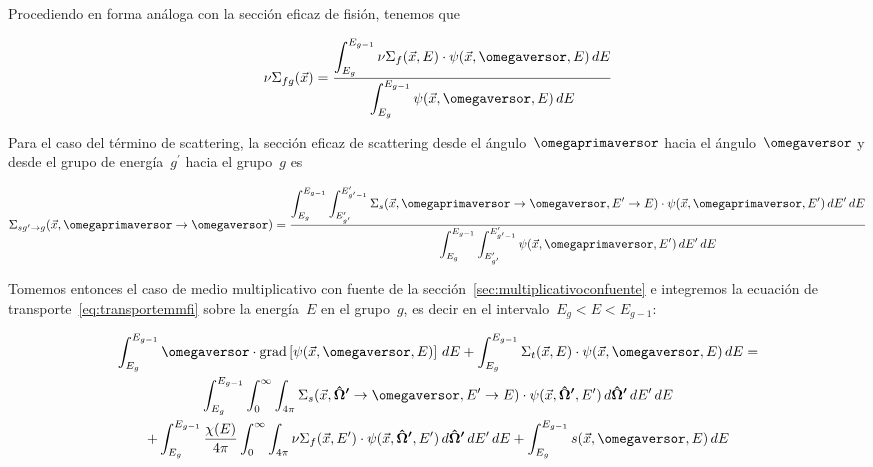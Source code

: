 Procediendo en forma análoga con la sección eficaz de fisión, tenemos que

\begin{equation}\label{eq:nusigmafg}
\nu\Sigma_{f g}(\vec{x}) = \frac{\displaystyle \int_{E_g}^{E_{g-1}} \nu\Sigma_f(\vec{x}, E) \cdot \psi(\vec{x}, \omegaversor, E) \, dE}{\displaystyle \int_{E_g}^{E_{g-1}} \psi(\vec{x}, \omegaversor, E) \, dE}
\end{equation}

Para el caso del término de scattering, la sección eficaz de scattering desde el ángulo~$\omegaprimaversor$ hacia el ángulo~$\omegaversor$ y desde el grupo de energía~$g^\prime$ hacia el grupo~$g$ es

\begin{equation}\label{eq:sigmasggprima}
\Sigma_{s g^\prime \rightarrow g}(\vec{x}, \omegaprimaversor \rightarrow \omegaversor) =
\frac{\displaystyle \int_{E_g}^{E_{g-1}} \int_{E^\prime_{g^\prime}}^{E^\prime_{g^\prime -1}}
\Sigma_{s}(\vec{x}, \omegaprimaversor \rightarrow \omegaversor, E^\prime \rightarrow E) \cdot \psi(\vec{x}, \omegaprimaversor, E^\prime) \, dE^\prime \, dE }
{\displaystyle \int_{E_g}^{E_{g-1}} \int_{E^\prime_{g^\prime}}^{E^\prime_{g^\prime -1}} \psi(\vec{x}, \omegaprimaversor, E^\prime) \, dE^\prime \, dE}
\end{equation}


\bigskip

Tomemos entonces el caso de medio multiplicativo con fuente de la sección~\ref{sec:multiplicativoconfuente} e integremos la ecuación de transporte~\eqref{eq:transportemmfi} sobre la energía~$E$ en el grupo~$g$, es decir en el intervalo~$E_g < E < E_{g-1}$:

\begin{multline*}
 \int_{E_g}^{E_{g-1}} \omegaversor \cdot \text{grad} \left[ \psi(\vec{x}, \omegaversor, E) \right] \, dE
 + \int_{E_g}^{E_{g-1}}  \Sigma_t(\vec{x}, E) \cdot \psi(\vec{x}, \omegaversor, E) \, dE = \\
 \int_{E_g}^{E_{g-1}}  \int_{0}^{\infty} \int_{4\pi} \Sigma_s(\vec{x}, \boldsymbol{\hat{\Omega}^\prime} \rightarrow \omegaversor, E^\prime \rightarrow E) \cdot \psi(\vec{x}, \boldsymbol{\hat{\Omega}^\prime}, E^\prime) \, d\boldsymbol{\hat{\Omega}^\prime} \, dE^\prime \, dE \\
+ \int_{E_g}^{E_{g-1}}  \frac{\chi(E)}{4\pi} \int_{0}^{\infty} \int_{4\pi} \nu\Sigma_f(\vec{x}, E^\prime) \cdot \psi(\vec{x}, \boldsymbol{\hat{\Omega}^\prime}, E^\prime) \, d\boldsymbol{\hat{\Omega}^\prime} \, dE^\prime \, dE
+ \int_{E_g}^{E_{g-1}}  s(\vec{x}, \omegaversor, E) \, dE
\end{multline*}

